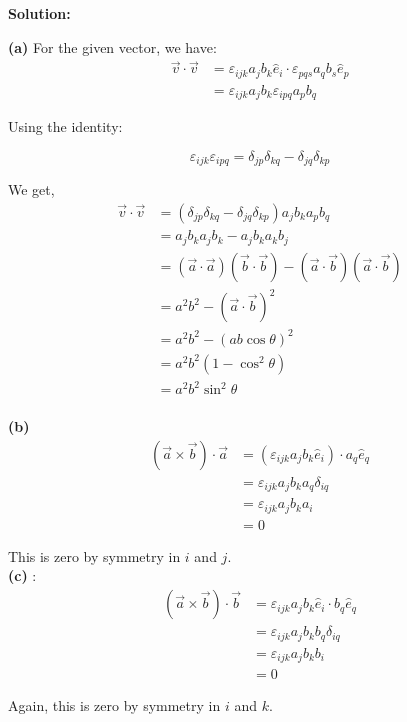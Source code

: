 \documentclass[a4paper,12pt]{article}
\begin{document}
\begin{enumerate}
\textbf{Solution:}

\textbf{(a)} For the given vector, we have:
\[
\begin{aligned}
\vec{v} \cdot \vec{v} 
&= \varepsilon_{ijk} a_j b_k \hat{e}_i \cdot \varepsilon_{pqs} a_q b_s \hat{e}_p \\
&= \varepsilon_{ijk} a_j b_k \varepsilon_{ipq} a_p b_q
\end{aligned}
\]

Using the identity:

\[
\boxed{
\varepsilon_{ijk} \varepsilon_{ipq}
= \delta_{jp} \delta_{kq} - \delta_{jq} \delta_{kp}
}
\]

We get, 
\[
\begin{aligned}
\vec{v} \cdot \vec{v}&= (\delta_{jp} \delta_{kq} - \delta_{jq} \delta_{kp}) a_j b_k a_p b_q \\
&= a_j b_k a_j b_k - a_j b_k a_k b_j\\
&= (\vec{a} \cdot \vec{a})(\vec{b} \cdot \vec{b}) - (\vec{a} \cdot \vec{b}) (\vec{a} \cdot \vec{b})\\
&= a^2 b^2 - (\vec a \cdot \vec b )^2\\
&=a^2 b^2 - (ab \cos \theta)^2\\
&= a^2 b^2 (1 - \cos^2 \theta)\\
&= a^2 b^2 \sin^2 \theta\\
\end{aligned}
\]

\textbf{(b)}
\begin{align*}
(\vec{a} \times \vec{b}) \cdot \vec{a} 
&= (\varepsilon_{ijk} a_j b_k \hat{e}_i) \cdot a_q \hat{e}_q \\
&= \varepsilon_{ijk} a_j b_k a_q \delta_{iq} \\
&= \varepsilon_{ijk} a_j b_k a_i \\
&= 0
\end{align*}


This is zero by symmetry in \( i \) and \( j \).\\ 

\textbf{(c)} :
\begin{align*}
(\vec{a} \times \vec{b}) \cdot \vec{b}
&= \varepsilon_{ijk} a_j b_k \hat{e}_i \cdot b_q \hat{e}_q \\
&= \varepsilon_{ijk} a_j b_k b_q \delta_{iq} \\
&= \varepsilon_{ijk} a_j b_k b_i \\
&= 0
\end{align*}


Again, this is zero by symmetry in \( i \) and \( k \).\\




\end{enumerate}
\end{document}
